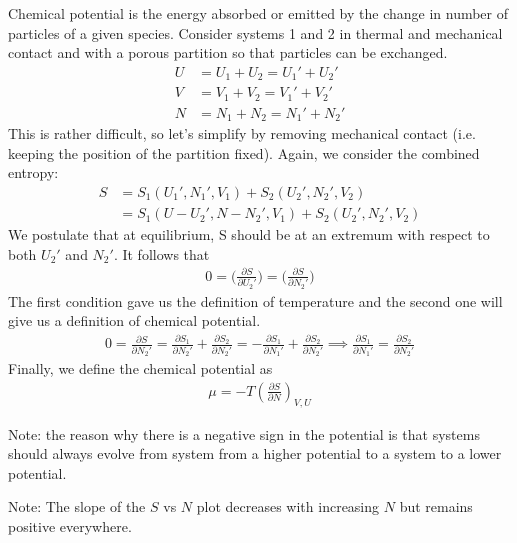 \documentclass[11pt]{article}
\begin{document}
Chemical potential is the energy absorbed or emitted by the change in number of particles of a given species. Consider systems 1 and 2 in thermal and mechanical contact and with a porous partition so that particles can be exchanged. 
\begin{align*}
    U &= U_1 + U_2 = U_1' + U_2' \tag{total energy fixed}\\
    V &= V_1 + V_2 = V_1' + V_2' \tag{total volume fixed} \\
    N &= N_1 + N_2 = N_1' + N_2' \tag{total number of particles fixed} 
\end{align*}
This is rather difficult, so let's simplify by removing mechanical contact (i.e. keeping the position of the partition fixed). Again, we consider the combined entropy: 
\begin{align*}
    S &= S_1(U_1', N_1', V_1) + S_2(U_2', N_2', V_2) \\
    &= S_1(U - U_2', N - N_2', V_1) + S_2(U_2', N_2', V_2) 
\end{align*}
We postulate that at equilibrium, S should be at an extremum with respect to both $U_2'$ and $N_2'$. It follows that
\begin{align*}
    0 = \Big(\frac{\partial S}{\partial U_2'}\Big) = \Big(\frac{\partial S}{\partial N_2'}\Big)
\end{align*}
The first condition gave us the definition of temperature and the second one will give us a definition of chemical potential. 
\begin{align*}
    0 = \frac{\partial S}{\partial N_2'} = \frac{\partial S_1}{\partial N_2'} + \frac{\partial S_2}{\partial N_2'} = -\frac{\partial S_1}{\partial N_1'} + \frac{\partial S_2}{\partial N_2'} \implies \frac{\partial S_1}{\partial N_1'}= \frac{\partial S_2}{\partial N_2'}
\end{align*}
Finally, we define the chemical potential as 
\begin{align*}
    \mu = -T (\frac{\partial S}{\partial N})_{V,U}
\end{align*}

Note: the reason why there is a negative sign in the potential is that systems should always evolve from system from a higher potential to a system to a lower potential. 

Note: The slope of the $S$ vs $N$ plot decreases with increasing $N$ but remains positive everywhere. 

\end{document}
